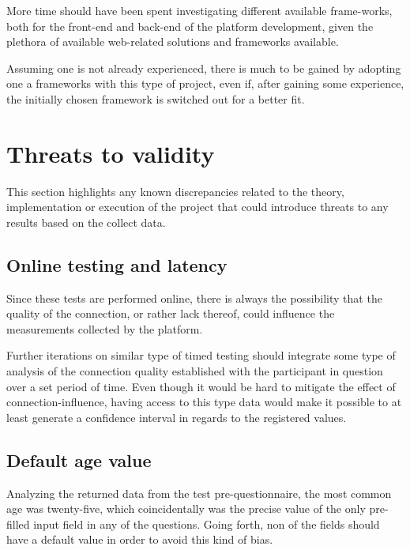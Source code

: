   More time should have been spent investigating different available
  frame-works, both for the front-end and back-end of the platform development,
  given the plethora of available web-related solutions and frameworks available.

  Assuming one is not already experienced, there is much to be gained by
  adopting one a frameworks with this type of project, even if, after gaining
  some experience, the initially chosen framework is switched out for a better
  fit.

  \section{Threats to validity}

  This section highlights any known discrepancies related to the theory,
  implementation or execution of the project that could introduce threats to
  any results based on the collect data.

  \subsection{Online testing and latency}

  Since these tests are performed online, there is always the possibility that
  the quality of the connection, or rather lack thereof, could influence the
  measurements collected by the platform.

  Further iterations on similar type of timed testing should integrate some
  type of analysis of the connection quality established with the participant
  in question over a set period of time. Even though it would be hard to
  mitigate the effect of connection-influence, having access to this type data
  would make it possible to at least generate a confidence interval in regards
  to the registered values.

  \subsection{Default age value}\label{label_validity_default_age}


  Analyzing the returned data from the test pre-questionnaire, the most common
  age was twenty-five, which coincidentally was the precise value of the only
  pre-filled input field in any of the questions. Going forth, non of the
  fields should have a default value in order to avoid this kind of bias.

